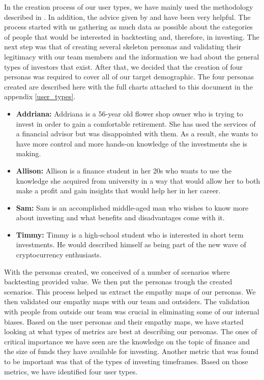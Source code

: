 \documentclass[main.tex]{subfiles}
\begin{document}
In the creation process of our user types, we have mainly used the methodology described in \cite{pathy}. In addition, the advice given by \cite{uiux_fundation} and \cite{user_types_interaction_design_fundation} have been very helpful. The process started with us gathering as much data as possible about the categories of people that would be interested in backtesting and, therefore, in investing. The next step was that of creating several skeleton personas \cite{personas} and validating their legitimacy with our team members and the information we had about the general types of investors that exist. After that, we decided that the creation of four personas was required to cover all of our target demographic.
The four personas created are described here with the full charts attached to this document in the appendix \ref{user_types}.
\begin{itemize}
\item \textbf{Addriana: }Addriana is a 56-year old flower shop owner who is trying to invest in order to gain a comfortable retirement. She has used the services of a financial advisor but was disappointed with them. As a result, she wants to have more control and more hands-on knowledge of the investments she is making.
\item \textbf{Allison: }Allison is a finance student in her 20s who wants to use the knowledge she acquired from university in a way that would allow her to both make a profit and gain insights that would help her in her career.
\item\textbf{Sam: }Sam is an accomplished middle-aged man who wishes to know more about investing and what benefits and disadvantages come with it. 
\item\textbf{Timmy: }Timmy is a high-school student who is interested in short term investments. He would described himself as being part of the new wave of cryptocurrency enthusiasts.
\end{itemize}

With the personas created, we conceived of a number of scenarios where backtesting provided value. We then put the personas trough the created scenarios. This process helped us extract the empathy maps \cite{empathy_maps} of our personas. We then validated our empathy maps with our team and outsiders. The validation with people from outside our team was crucial in eliminating some of our internal biases.
Based on the user personas and their empathy maps, we have started looking at what types of metrics are best at describing our personas. The ones of critical importance we have seen are the knowledge on the topic of finance and the size of funds they have available for investing. Another metric that was found to be important was that of the types of investing timeframes. Based on those metrics, we have identified four user types.
\end{document}
